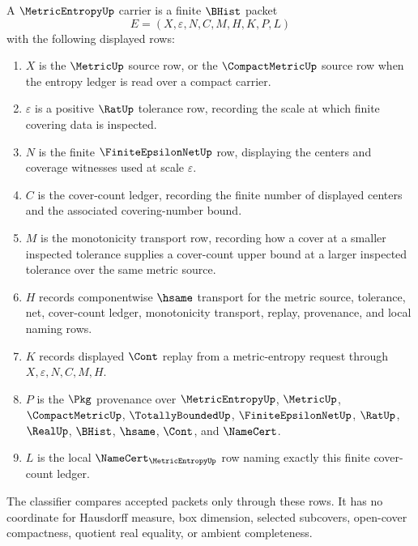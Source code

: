 \begin{definition}
\label{def:metric-entropy-carrier}
A $\MetricEntropyUp$ carrier is a finite $\BHist$ packet
$$
E=(X,\varepsilon,N,C,M,H,K,P,L)
$$
with the following displayed rows:
\begin{enumerate}
\item $X$ is the $\MetricUp$ source row, or the $\CompactMetricUp$ source row when the entropy ledger is read over a compact carrier.
\item $\varepsilon$ is a positive $\RatUp$ tolerance row, recording the scale at which finite covering data is inspected.
\item $N$ is the finite $\FiniteEpsilonNetUp$ row, displaying the centers and coverage witnesses used at scale $\varepsilon$.
\item $C$ is the cover-count ledger, recording the finite number of displayed centers and the associated covering-number bound.
\item $M$ is the monotonicity transport row, recording how a cover at a smaller inspected tolerance supplies a cover-count upper bound at a larger inspected tolerance over the same metric source.
\item $H$ records componentwise $\hsame$ transport for the metric source, tolerance, net, cover-count ledger, monotonicity transport, replay, provenance, and local naming rows.
\item $K$ records displayed $\Cont$ replay from a metric-entropy request through $X,\varepsilon,N,C,M,H$.
\item $P$ is the $\Pkg$ provenance over $\MetricEntropyUp$, $\MetricUp$, $\CompactMetricUp$, $\TotallyBoundedUp$, $\FiniteEpsilonNetUp$, $\RatUp$, $\RealUp$, $\BHist$, $\hsame$, $\Cont$, and $\NameCert$.
\item $L$ is the local $\NameCert_{\MetricEntropyUp}$ row naming exactly this finite cover-count ledger.
\end{enumerate}
The classifier compares accepted packets only through these rows. It has no coordinate for Hausdorff measure, box dimension, selected subcovers, open-cover compactness, quotient real equality, or ambient completeness.
\end{definition}

